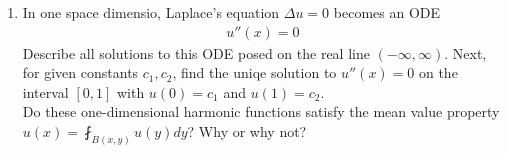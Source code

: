 \documentclass[10pt,a4paper]{report}
\begin{document}
\begin{description}
\begin{enumerate}
\begin{enumerate}
		\item Why did we only specify the boundary condition at he left-hand boundary $(x=0)$, not the right-hand boundary $(x=1)$?  In other words, what woudl go wrong if we specified boudnary conditions on both sides, as in 
		\begin{align*}
			\LBRACKET{\begin{array}{ll}
				u_t+3u_x=f(x,t), &0<x<1, t>0,\\
				u(x,0)=g(x),&\\
				u(0,t)=h_0(t),&\\
				u(1,t)=h_1(t),
			\end{array}
			}
		\end{align*}for some give functions $h_0(t)$ and $h_1(t)$?  (We can assume $g(0)=h_0(0)$ and $g(10=h_1(0)$, so that the intial and boundary conditions agree at the corners.)
		
		\end{enumerate}
		
		\item In one space dimensio, Laplace's equation $\Delta u=0$ becomes an ODE
		\begin{align*}
			u''(x)=0
		\end{align*}Describe all solutions to this ODE posed on the real line $(-\infty, \infty)$.  Next, for given constants $c_1,c_2$, find the uniqe solution to $u''(x)=0$ on the interval $[0,1]$ with $u(0)=c_1$ and $u(1)=c_2$.\\
		Do these one-dimensional harmonic functions satisfy the mean value property $u(x)=\fint_{B(x,y)}u(y)dy$?  Why or why not?


\end{enumerate}
\end{description}
\end{document}
